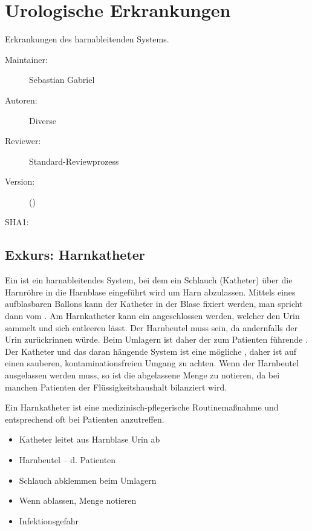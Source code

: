 \def\ChapterCode{URO}
\chapter
[\CO{[URO]} Urologische Erkrankungen]
{Urologische Erkrankungen}
\ChapterIntro
{%
Erkrankungen des harnableitenden Systems.
}
{%
\begin{description}
  \item[Maintainer:] Sebastian Gabriel
  \item[Autoren:] Diverse
  \item[Reviewer:] Standard-Reviewprozess
  \item[Version:] {\DocVersion} ({\DocVersionInfo})
  \item[SHA1:] {\DocGitCommit}
\end{description}

{\TxTeilkapitelAASS}
}


\clearpage
\section{Exkurs: Harnkatheter}


{Ein  ist ein harnableitendes System, bei dem ein
Schlauch (Katheter) über die Harnröhre in die Harnblase
eingeführt wird um Harn abzulassen. Mittels eines
aufblasbaren Ballons kann der Katheter in der Blase fixiert
werden, man spricht dann vom . Am
Harnkatheter kann ein  angeschlossen werden,
welcher den Urin sammelt und sich entleeren lässt. Der
Harnbeutel muss  sein, da
andernfalls der Urin zurückrinnen würde. Beim Umlagern
ist daher der zum Patienten führende . Der Katheter und das daran hängende System ist
eine mögliche , daher ist auf einen
sauberen, kontaminationsfreien Umgang zu achten.
Wenn der Harnbeutel ausgelassen werden muss, so ist die
abgelassene Menge zu notieren, da bei manchen Patienten der
Flüssigkeitshaushalt bilanziert wird.

Ein Harnkatheter ist eine
medizinisch-pflegerische Routinemaßnahme und entsprechend
oft bei Patienten anzutreffen.}
{
\begin{itemize}
  \item Katheter leitet aus Harnblase Urin ab
  \item Harnbeutel --  d. Patienten
  \item Schlauch abklemmen beim Umlagern
  \item Wenn ablassen, Menge notieren
  \item Infektionsgefahr
\end{itemize}
}
{}
{}
{}



